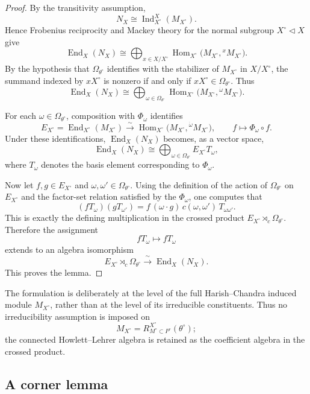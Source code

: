 \documentclass{amsart}
\theoremstyle{plain}
\numberwithin{equation}{section}
\theoremstyle{definition}
\newcommand{\Ind}{\operatorname{Ind}}
\newcommand{\End}{\operatorname{End}}
\newcommand{\Hom}{\operatorname{Hom}}
\begin{document}
\begin{proof}
By the transitivity assumption,
\[
N_X\cong \Ind_{X^\circ}^{X}(M_{X^\circ}).
\]
Hence Frobenius reciprocity and Mackey theory for the normal subgroup
$X^\circ\lhd X$ give
\[
\End_X(N_X)
\cong
\bigoplus_{x\in X/X^\circ}
\Hom_{X^\circ}\!\bigl(M_{X^\circ},{}^xM_{X^\circ}\bigr).
\]
By the hypothesis that $\Omega_{\theta^\circ}$ identifies with the stabilizer of
$M_{X^\circ}$ in $X/X^\circ$, the summand indexed by $xX^\circ$ is nonzero if and only if
$xX^\circ\in \Omega_{\theta^\circ}$. Thus
\[
\End_X(N_X)
\cong
\bigoplus_{\omega\in \Omega_{\theta^\circ}}
\Hom_{X^\circ}\!\bigl(M_{X^\circ},{}^{\dot\omega}M_{X^\circ}\bigr).
\]

For each $\omega\in\Omega_{\theta^\circ}$, composition with $\Phi_\omega$ identifies
\[
E_{X^\circ}
=
\End_{X^\circ}(M_{X^\circ})
\xrightarrow{\sim}
\Hom_{X^\circ}\!\bigl(M_{X^\circ},{}^{\dot\omega}M_{X^\circ}\bigr),
\qquad
f\longmapsto \Phi_\omega\circ f.
\]
Under these identifications, $\End_X(N_X)$ becomes, as a vector space,
\[
\End_X(N_X)\cong \bigoplus_{\omega\in\Omega_{\theta^\circ}} E_{X^\circ}T_\omega,
\]
where $T_\omega$ denotes the basis element corresponding to $\Phi_\omega$.

Now let $f,g\in E_{X^\circ}$ and $\omega,\omega'\in\Omega_{\theta^\circ}$.
Using the definition of the action of $\Omega_{\theta^\circ}$ on $E_{X^\circ}$ and the
factor-set relation satisfied by the $\Phi_\omega$, one computes that
\[
(fT_\omega)(gT_{\omega'})
=
f\,(\omega\cdot g)\,c(\omega,\omega')\,T_{\omega\omega'}.
\]
This is exactly the defining multiplication in the crossed product
$E_{X^\circ}\rtimes_c \Omega_{\theta^\circ}$.
Therefore the assignment
\[
fT_\omega\longmapsto fT_\omega
\]
extends to an algebra isomorphism
\[
E_{X^\circ}\rtimes_c \Omega_{\theta^\circ}
\xrightarrow{\ \sim\ }
\End_X(N_X).
\]
This proves the lemma.
\end{proof}

The formulation is deliberately at the level of the full Harish--Chandra induced
module \(M_{X^\circ}\), rather than at the level of its irreducible constituents.
Thus no irreducibility assumption is imposed on
\[
M_{X^\circ}=R^{X^\circ}_{M^\circ\subset P^\circ}(\theta^\circ);
\]
the connected Howlett--Lehrer algebra is retained as the coefficient algebra in
the crossed product.
\medskip
\subsection{A corner lemma}
\label{subsec:corner-lemma}
\end{document}
